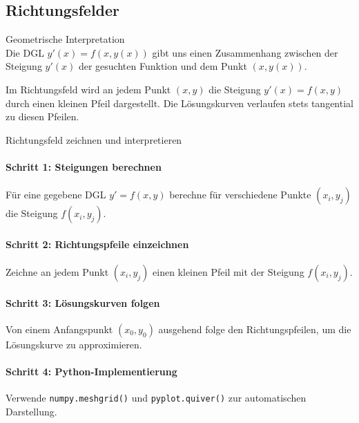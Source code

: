 \subsection{Richtungsfelder}

\begin{concept}{Geometrische Interpretation}\\
Die DGL $y'(x) = f(x, y(x))$ gibt uns einen Zusammenhang zwischen der Steigung $y'(x)$ der gesuchten Funktion und dem Punkt $(x, y(x))$.

Im Richtungsfeld wird an jedem Punkt $(x,y)$ die Steigung $y'(x) = f(x,y)$ durch einen kleinen Pfeil dargestellt. Die Lösungskurven verlaufen stets tangential zu diesen Pfeilen.
\end{concept}

\begin{KR}{Richtungsfeld zeichnen und interpretieren}\\
\paragraph{Schritt 1: Steigungen berechnen}
Für eine gegebene DGL $y' = f(x,y)$ berechne für verschiedene Punkte $(x_i, y_j)$ die Steigung $f(x_i, y_j)$.

\paragraph{Schritt 2: Richtungspfeile einzeichnen}
Zeichne an jedem Punkt $(x_i, y_j)$ einen kleinen Pfeil mit der Steigung $f(x_i, y_j)$.

\paragraph{Schritt 3: Lösungskurven folgen}
Von einem Anfangspunkt $(x_0, y_0)$ ausgehend folge den Richtungspfeilen, um die Lösungskurve zu approximieren.

\paragraph{Schritt 4: Python-Implementierung}
Verwende \texttt{numpy.meshgrid()} und \texttt{pyplot.quiver()} zur automatischen Darstellung.
\end{KR}

